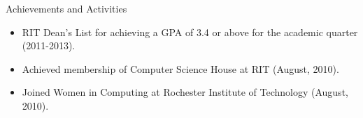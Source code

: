 \documentclass[11pt,oneside]{article}
\newenvironment{ressection}[1]{
	\vspace{1pt}
	{\fontfamily{phv}\selectfont\Large#1}
	\begin{itemize}
	\vspace{-2pt}
}{
	\end{itemize}
}
\newcommand{\resitem}[1]{
	\vspace{-4pt}
	\item \begin{flushleft} #1 \end{flushleft}
}
\begin{document}
\begin{ressection}{Achievements and Activities}
	\resitem{RIT Dean's List for achieving a GPA of 3.4 or above for the academic quarter (2011-2013).}

	\resitem{Achieved membership of Computer Science House at RIT (August, 2010).}

	\resitem{Joined Women in Computing at Rochester Institute of Technology (August, 2010).}


\end{ressection}
\end{document}
